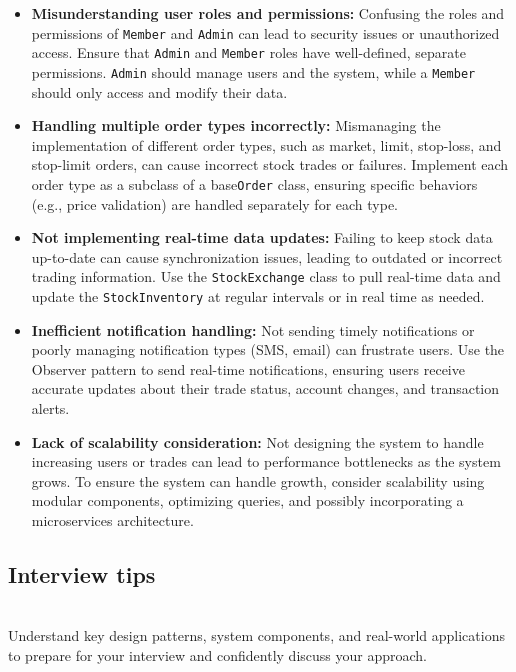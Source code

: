 \begin{itemize}
\item
\protect{}\label{TxpPecp2r3k8eCHlvzIys}
\textbf{Misunderstanding user roles and permissions:} Confusing the roles and permissions of \texttt{Member} and \texttt{Admin} can lead to security issues or unauthorized access. Ensure that \texttt{Admin} and \texttt{Member} roles have well-defined, separate permissions. \texttt{Admin} should manage users and the system, while a \texttt{Member} should only access and modify their data.
\item
\protect{}\label{ylao1-VnEfBCe0d67AI7G}
\textbf{Handling multiple order types incorrectly:} Mismanaging the implementation of different order types, such as market, limit, stop-loss, and stop-limit orders, can cause incorrect stock trades or failures. Implement each order type as a subclass of a base\texttt{Order} class, ensuring specific behaviors (e.g., price validation) are handled separately for each type.
\item
\protect{}\label{JY-KIcIW_OsBASsbmSdyZ}
\textbf{Not implementing real-time data updates:} Failing to keep stock data up-to-date can cause synchronization issues, leading to outdated or incorrect trading information. Use the \texttt{StockExchange} class to pull real-time data and update the \texttt{StockInventory} at regular intervals or in real time as needed.
\item
\protect{}\label{P7tMND293AwIO1m3j2Mng}
\textbf{Inefficient notification handling:} Not sending timely notifications or poorly managing notification types (SMS, email) can frustrate users. Use the Observer pattern to send real-time notifications, ensuring users receive accurate updates about their trade status, account changes, and transaction alerts.
\item
\protect{}\label{WdNVyDyejnhcg2Mf2jfuL}
\textbf{Lack of scalability consideration:} Not designing the system to handle increasing users or trades can lead to performance bottlenecks as the system grows. To ensure the system can handle growth, consider scalability using modular components, optimizing queries, and possibly incorporating a microservices architecture.
\end{itemize}

\subsection{Interview tips}\label{cVQsxQ-2AMmzv-daXOJ38}
\\
Understand key design patterns, system components, and real-world applications to prepare for your interview and confidently discuss your approach.

